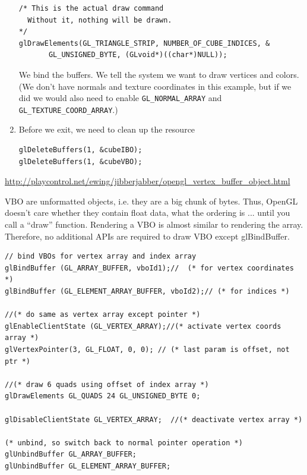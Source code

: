 \begin{enumerate}
\begin{verbatim}
/* This is the actual draw command
  Without it, nothing will be drawn.
*/
glDrawElements(GL_TRIANGLE_STRIP, NUMBER_OF_CUBE_INDICES, &
       GL_UNSIGNED_BYTE, (GLvoid*)((char*)NULL));
\end{verbatim}
  We bind the buffers. We tell the system we want to draw vertices and
  colors. (We don't have normals and texture coordinates in this
  example, but if we did we would also need to enable
  \verb!GL_NORMAL_ARRAY! and \verb!GL_TEXTURE_COORD_ARRAY!.)

\item Before we exit, we need to clean up the resource
\begin{verbatim}
glDeleteBuffers(1, &cubeIBO);
glDeleteBuffers(1, &cubeVBO);
\end{verbatim}
\end{enumerate}
\url{http://playcontrol.net/ewing/jibberjabber/opengl_vertex_buffer_object.html} 


VBO are unformatted objects, i.e. they are a big chunk of bytes. Thus,
OpenGL doesn't care whether they contain float data, what the ordering
is ... until you call a ``draw'' function. Rendering a VBO is almost
similar to rendering the array. Therefore, no additional APIs are
required to draw VBO except glBindBuffer.
\begin{verbatim}
// bind VBOs for vertex array and index array
glBindBuffer (GL_ARRAY_BUFFER, vboId1);//  (* for vertex coordinates *)
glBindBuffer (GL_ELEMENT_ARRAY_BUFFER, vboId2);// (* for indices *)

//(* do same as vertex array except pointer *)
glEnableClientState (GL_VERTEX_ARRAY);//(* activate vertex coords array *)
glVertexPointer(3, GL_FLOAT, 0, 0); // (* last param is offset, not ptr *)

//(* draw 6 quads using offset of index array *)
glDrawElements GL_QUADS 24 GL_UNSIGNED_BYTE 0;

glDisableClientState GL_VERTEX_ARRAY;  //(* deactivate vertex array *)

(* unbind, so switch back to normal pointer operation *)
glUnbindBuffer GL_ARRAY_BUFFER;
glUnbindBuffer GL_ELEMENT_ARRAY_BUFFER;
\end{verbatim}



